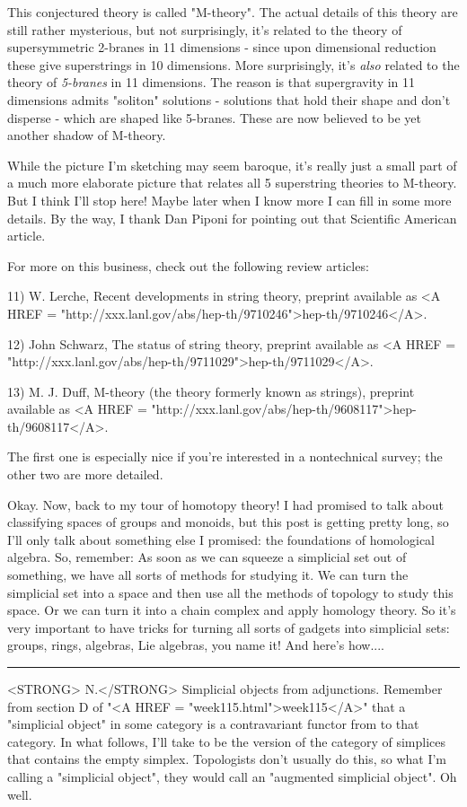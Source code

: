 $$
    
This conjectured theory is called "M-theory".  The actual details of
this theory are still rather mysterious, but not surprisingly, it's
related to the theory of supersymmetric 2-branes in 11 dimensions -
since upon dimensional reduction these give superstrings in 10
dimensions.  More surprisingly, it's \emph{also} related to the theory of
\emph{5-branes} in 11 dimensions.  The reason is that supergravity in 11
dimensions admits "soliton" solutions - solutions that hold their shape
and don't disperse - which are shaped like 5-branes.  These are now
believed to be yet another shadow of M-theory.

While the picture I'm sketching may seem baroque, it's really just a
small part of a much more elaborate picture that relates all 5
superstring theories to M-theory.  But I think I'll stop here!  Maybe
later when I know more I can fill in some more details.  By the way, I
thank Dan Piponi for pointing out that Scientific American article.  

For more on this business, check out the following review articles:

11) W. Lerche, Recent developments in string theory, preprint available
as <A HREF = "http://xxx.lanl.gov/abs/hep-th/9710246">hep-th/9710246</A>.  

12) John Schwarz, The status of string theory, preprint available as
<A HREF = "http://xxx.lanl.gov/abs/hep-th/9711029">hep-th/9711029</A>.  

13) M. J. Duff, M-theory (the theory formerly known as strings),
preprint available as <A HREF = "http://xxx.lanl.gov/abs/hep-th/9608117">hep-th/9608117</A>.

The first one is especially nice if you're interested in a nontechnical
survey; the other two are more detailed.

Okay.  Now, back to my tour of homotopy theory!  I had promised to talk
about classifying spaces of groups and monoids, but this post is getting
pretty long, so I'll only talk about something else I promised: the
foundations of homological algebra.  So, remember:
As soon as we can squeeze a simplicial set out of something, we have all
sorts of methods for studying it.  We can turn the simplicial set into a
space and then use all the methods of topology to study this space.  Or
we can turn it into a chain complex and apply homology theory.  So it's
very important to have tricks for turning all sorts of gadgets into
simplicial sets: groups, rings, algebras, Lie algebras, you name it!
And here's how....
\par\noindent\rule{\textwidth}{0.4pt}
<STRONG> N.</STRONG>  Simplicial objects from adjunctions.  Remember from section D of
"<A HREF = "week115.html">week115</A>" that a "simplicial object" in some category is a contravariant
functor from \Delta  to that category.  In what follows, I'll take \Delta 
to be the version of the category of simplices that contains the empty
simplex.  Topologists don't usually do this, so what I'm calling a
"simplicial object", they would call an "augmented simplicial object".
Oh well.

